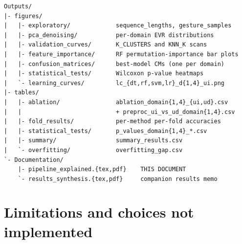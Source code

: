 \documentclass[11pt,a4paper]{article}
\begin{document}
\begin{lstlisting}[caption={Outputs/ tree as produced by CODE\_IA.py}]
Outputs/
|- figures/
|   |- exploratory/             sequence_lengths, gesture_samples
|   |- pca_denoising/           per-domain EVR distributions
|   |- validation_curves/       K_CLUSTERS and KNN_K scans
|   |- feature_importance/      RF permutation-importance bar plots
|   |- confusion_matrices/      best-model CMs (one per domain)
|   |- statistical_tests/       Wilcoxon p-value heatmaps
|   `- learning_curves/         lc_{dt,rf,svm,lr}_d{1,4}_ui.png
|- tables/
|   |- ablation/                ablation_domain{1,4}_{ui,ud}.csv
|   |                           + preproc_ui_vs_ud_domain{1,4}.csv
|   |- fold_results/            per-method per-fold accuracies
|   |- statistical_tests/       p_values_domain{1,4}_*.csv
|   |- summary/                 summary_results.csv
|   `- overfitting/             overfitting_gap.csv
`- Documentation/
    |- pipeline_explained.{tex,pdf}    THIS DOCUMENT
    `- results_synthesis.{tex,pdf}     companion results memo
\end{lstlisting}

\section{Limitations and choices not implemented}
\end{document}

